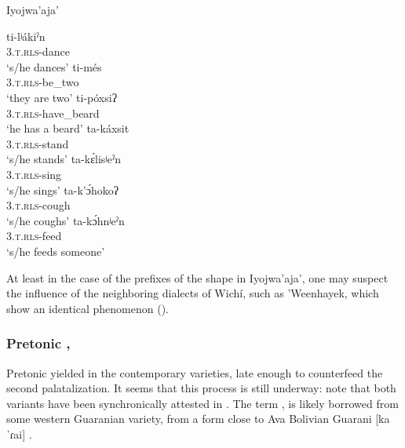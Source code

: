 \ea\label{ijw-ti-ta}
Iyojwa'aja' \citep{JC14a}
    \begin{xlist}
        \ex \gll ti-lʲákiˀn\\
            3.\textsc{t.rls}-dance\\
            \glt `s/he dances'
        \ex \gll ti-més\\
            3.\textsc{t.rls}-be\_two\\
            \glt `they are two'
        \ex \gll ti-póxsiʔ\\
            3.\textsc{t.rls}-have\_beard\\
            \glt `he has a beard'
        \ex \gll ta-káxsit\\
            3.\textsc{t.rls}-stand\\
            \glt `s/he stands'
        \ex \gll ta-kɛ́lisʲeˀn\\
            3.\textsc{t.rls}-sing\\
            \glt `s/he sings'
        \ex \gll ta-k’ɔ́hokoʔ\\
            3.\textsc{t.rls}-cough\\
            \glt `s/he coughs'
        \ex \gll ta-kɔ́hnʲeˀn\\
            3.\textsc{t.rls}-feed\\
            \glt `s/he feeds someone'
    \end{xlist}
\z

At least in the case of the prefixes of the shape  in Iyojwa’aja’, one may suspect the influence of the neighboring dialects of Wichí, such as ’Weenhayek, which show an identical phenomenon ().

\subsubsection{Pretonic , }\label{ch-pret-ao-o}

Pretonic   yielded  in the contemporary varieties, late enough to counterfeed the second palatalization. It seems that this process is still underway: note that both variants have been synchronically attested in  \citep[143--144]{ND09}. The term ,  is likely borrowed from some western Guaranian variety, from a form close to Ava Bolivian Guarani [kaˈɾai] \citep[76]{WD16}.

